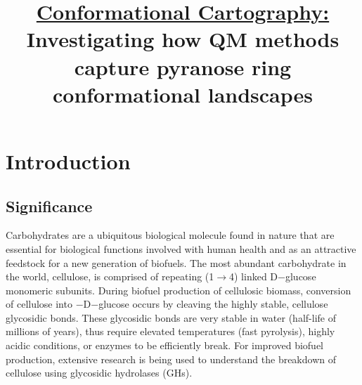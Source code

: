 \documentclass{article}
\begin{document}

\title{\ul{Conformational Cartography:} \\ Investigating how QM methods capture pyranose ring conformational landscapes}

\maketitle

\newpage
\section{Introduction}
\subsection{Significance}
Carbohydrates are a ubiquitous biological molecule found in nature that are essential for biological functions involved with human 
health\cite{Misurcova2012} and as an attractive feedstock for a new generation of biofuels.\cite{Huber2006,Sun2002} The most abundant
 carbohydrate in the world, cellulose, is comprised of repeating \textbeta(1$\rightarrow$4) linked D$-$glucose monomeric 
 subunits.\cite{Misurcova2012} During biofuel production of cellulosic biomass, conversion of cellulose into \textbeta$-$D$-$glucose occurs by cleaving 
the highly stable, cellulose glycosidic bonds. These glycosidic bonds are very stable in water (half-life of millions of years), thus require elevated 
temperatures (fast pyrolysis), highly acidic conditions, or enzymes to be efficiently break.\cite{Sun2002,Wolfenden1998} 	
For improved biofuel production, extensive research is being used to understand the breakdown of cellulose using glycosidic hydrolases 
(GHs).\cite{Huber2006,Monti2002,Davies1995}
\end{document}
